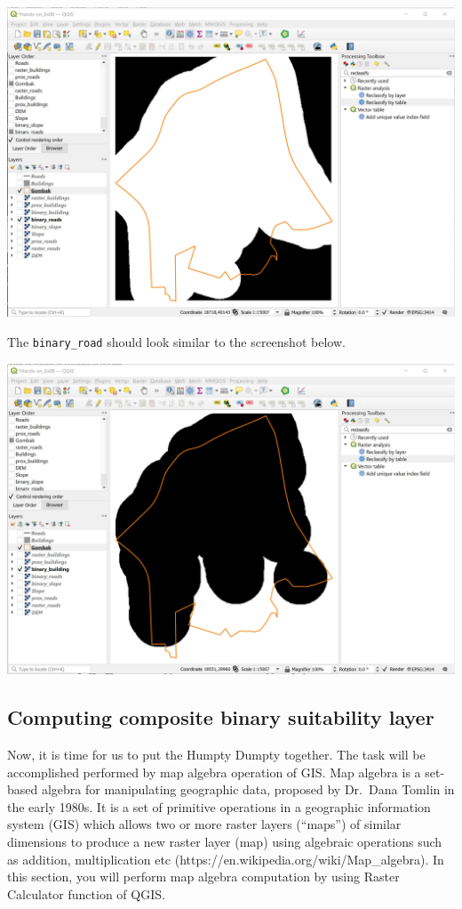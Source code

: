 \documentclass[
  letterpaper,
  DIV=11,
  numbers=noendperiod]{scrreprt}
\begin{document}
\includegraphics{./img07/image38.jpg}

The \texttt{binary\_road} should look similar to the screenshot below.

\includegraphics{./img07/image39.jpg}

\hypertarget{computing-composite-binary-suitability-layer}{%
\subsection{Computing composite binary suitability
layer}\label{computing-composite-binary-suitability-layer}}

Now, it is time for us to put the Humpty Dumpty together. The task will
be accomplished performed by map algebra operation of GIS. Map algebra
is a set-based algebra for manipulating geographic data, proposed by
Dr.~Dana Tomlin in the early 1980s. It is a set of primitive operations
in a geographic information system (GIS) which allows two or more raster
layers (``maps'') of similar dimensions to produce a new raster layer
(map) using algebraic operations such as addition, multiplication etc
(https://en.wikipedia.org/wiki/Map\_algebra). In this section, you will
perform map algebra computation by using Raster Calculator function of
QGIS.
\end{document}

